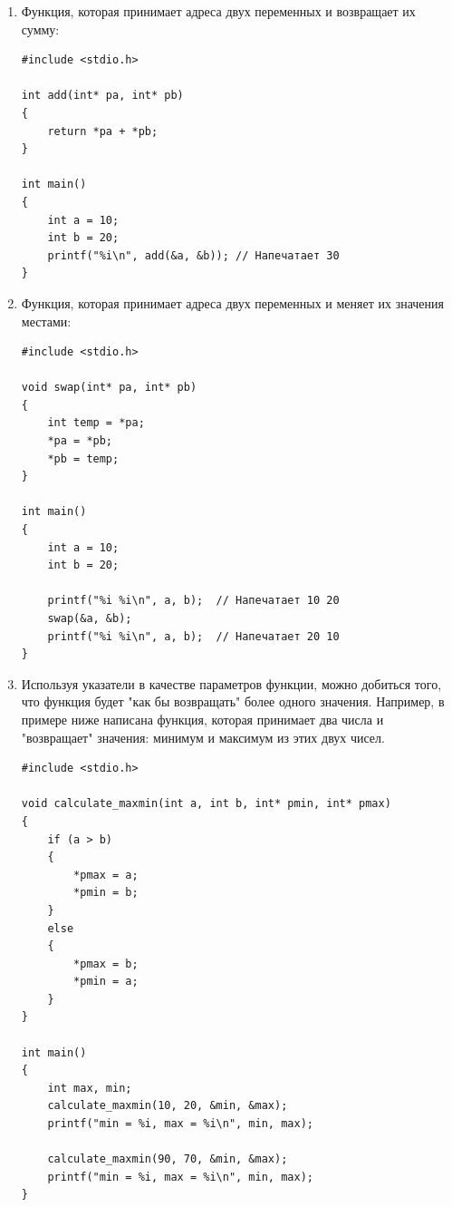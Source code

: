\documentclass{article}
\begin{document}
\begin{enumerate}

\item Функция, которая принимает адреса двух переменных и возвращает их сумму:
\begin{lstlisting}
#include <stdio.h>

int add(int* pa, int* pb)
{
    return *pa + *pb;
}

int main()
{
    int a = 10;
    int b = 20;
    printf("%i\n", add(&a, &b)); // Напечатает 30
}
\end{lstlisting}


\item Функция, которая принимает адреса двух переменных и меняет их значения местами:
\begin{lstlisting}
#include <stdio.h>

void swap(int* pa, int* pb)
{
    int temp = *pa;
    *pa = *pb;
    *pb = temp;
}

int main()
{
    int a = 10;
    int b = 20;

    printf("%i %i\n", a, b);  // Напечатает 10 20
    swap(&a, &b);
    printf("%i %i\n", a, b);  // Напечатает 20 10
}
\end{lstlisting}

\item Используя указатели в качестве параметров функции, можно добиться того, что функция будет "как бы возвращать" \space более одного значения. Например, в примере ниже написана функция, которая принимает два числа и "возвращает"  значения: минимум и максимум из этих двух чисел.

\begin{lstlisting}
#include <stdio.h>

void calculate_maxmin(int a, int b, int* pmin, int* pmax)
{
    if (a > b)
    {
        *pmax = a;
        *pmin = b;
    }
    else
    {
        *pmax = b;
        *pmin = a;
    }
}

int main()
{
    int max, min;
    calculate_maxmin(10, 20, &min, &max);
    printf("min = %i, max = %i\n", min, max);

    calculate_maxmin(90, 70, &min, &max);
    printf("min = %i, max = %i\n", min, max);
}
\end{lstlisting}
\end{enumerate}
\end{document}
